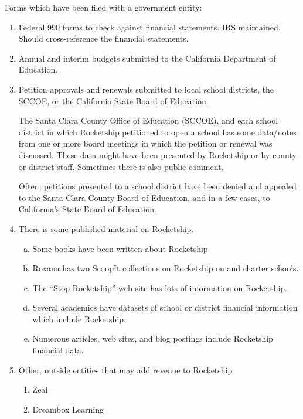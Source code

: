 Forms which have been filed with a government entity:
 \begin{enumerate}
  \item Federal 990 forms to check against financial statements. IRS maintained. Should cross-reference the financial statements.
  \item Annual and interim budgets submitted to the California Department of Education.
  \item Petition approvals and renewals submitted to local school districts, the SCCOE, or the California State Board of Education.

  The Santa Clara County Office of Education (SCCOE), and each school district in which Rocketship petitioned to open a school has some data/notes from one or more board meetings in which the petition or renewal was discussed. These data might have been presented by Rocketship or by county or district staff. Sometimes there is also public comment.
  
Often, petitions presented to a school district have been denied and appealed to the Santa Clara County Board of Education, and in a few cases, to California's State Board of Education.
  
  \item There is some published material on Rocketship.
  \begin{enumerate}[a.]
    \item Some books have been written about Rocketship
    \item Roxana has two ScoopIt collections on Rocketship on and charter schools.
    \item The ``Stop Rocketship'' web site has lots of information on Rocketship.
    \item Several academics have datasets of school or district financial information  which include Rocketship.
    \item Numerous articles, web sites, and blog postings include Rocketship financial data.
  \end{enumerate}
  \item Other, outside entities that may add revenue to Rocketship
  \begin{enumerate}
    \item Zeal
    \item Dreambox Learning
  \end{enumerate}
\end{enumerate}

